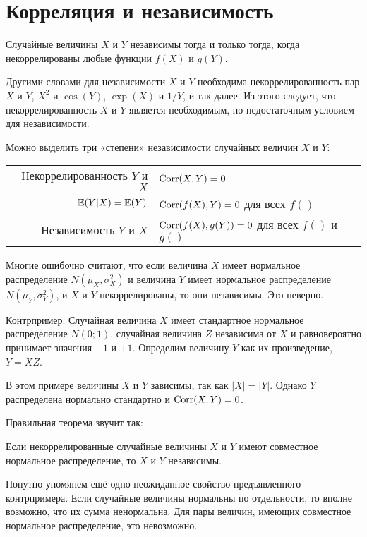\documentclass[10pt]{article}
\begin{document}
\section{Корреляция и независимость}

\begin{theorem}
Случайные величины $X$ и $Y$ независимы тогда и только тогда, когда некоррелированы любые функции $f(X)$ и $g(Y)$.
\end{theorem}

Другими словами для независимости $X$ и $Y$ необходима некоррелированность пар $X$ и $Y$, $X^2$ и $\cos(Y)$, $\exp(X)$ и $1/Y$, и так далее. Из этого следует, что некоррелированность $X$ и $Y$ является необходимым, но недостаточным условием для независимости.

Можно выделить три «степени» независимости случайных величин $X$ и $Y$:

\begin{tabular}{rl}
\toprule
Некоррелированность $Y$ и $X$ & $\operatorname{Corr}(X,Y)=0$ \\ 
$\mathbb{E}(Y|X)=\mathbb{E}(Y)$ & $\operatorname{Corr}(f(X),Y)=0$ для всех $f()$ \\ 
Независимость $Y$ и $X$ & $\operatorname{Corr}(f(X),g(Y))=0$ для всех $f()$ и $g()$ \\ 
\bottomrule
\end{tabular} 



Многие ошибочно считают, что если величина $X$ имеет нормальное распределение $N(\mu_X, \sigma^2_X)$ и величина $Y$ имеет нормальное распределение $N(\mu_Y, \sigma^2_Y)$, и $X$ и $Y$ некоррелированы, то они независимы. Это неверно.

Контрпример. Случайная величина $X$ имеет стандартное нормальное распределение $N(0;1)$, случайная величина $Z$ независима от $X$ и равновероятно принимает значения $-1$ и $+1$. Определим величину $Y$ как их произведение, $Y=XZ$. 

В этом примере величины $X$ и $Y$ зависимы, так как $|X|=|Y|$. Однако $Y$ распределена нормально стандартно и $\operatorname{Corr}(X,Y)=0$.  

Правильная теорема звучит так:

\begin{theorem}
Если некоррелированные случайные величины $X$ и $Y$ имеют совместное нормальное распределение, то $X$ и $Y$ независимы.
\end{theorem}

Попутно упомянем ещё одно неожиданное свойство предъявленного контрпримера. Если случайные величины нормальны по отдельности, то вполне возможно, что их сумма ненормальна. Для пары величин, имеющих совместное нормальное распределение, это невозможно.
\end{document}
